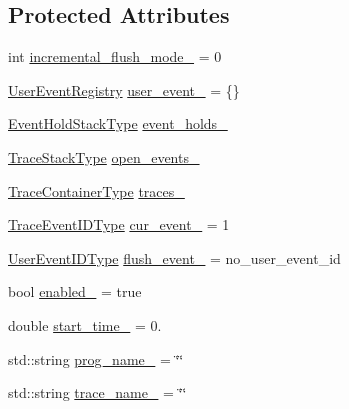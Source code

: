 \subsection*{Protected Attributes}
\begin{DoxyCompactItemize}
\item 
int \hyperlink{structvt_1_1trace_1_1_trace_lite_a0f5139a30b7eef896d0b49b22b97fec3}{incremental\+\_\+flush\+\_\+mode\+\_\+} = 0
\item 
\hyperlink{structvt_1_1trace_1_1_user_event_registry}{User\+Event\+Registry} \hyperlink{structvt_1_1trace_1_1_trace_lite_a7dcadada68a0b250898d7838de01458b}{user\+\_\+event\+\_\+} = \{\}
\item 
\hyperlink{structvt_1_1trace_1_1_trace_lite_af9e05e83b3d0adfb9d45cf13c0bb7525}{Event\+Hold\+Stack\+Type} \hyperlink{structvt_1_1trace_1_1_trace_lite_a323d77bc03ed78b44e632c595433b7ba}{event\+\_\+holds\+\_\+}
\item 
\hyperlink{structvt_1_1trace_1_1_trace_lite_ae827dd1c4f37ac2dbcb6f4898a664b99}{Trace\+Stack\+Type} \hyperlink{structvt_1_1trace_1_1_trace_lite_a11cf264af89fe8dd3703e8897d0bb77b}{open\+\_\+events\+\_\+}
\item 
\hyperlink{structvt_1_1trace_1_1_trace_lite_a346a7751a544de425345a8983ed52146}{Trace\+Container\+Type} \hyperlink{structvt_1_1trace_1_1_trace_lite_a3751cf984ddc83e14f120daf5d533a2c}{traces\+\_\+}
\item 
\hyperlink{namespacevt_1_1trace_a64a7185f3e102df8d8258f263ccd1582}{Trace\+Event\+I\+D\+Type} \hyperlink{structvt_1_1trace_1_1_trace_lite_a06815b5d345c41f07105dd382b4c3c2b}{cur\+\_\+event\+\_\+} = 1
\item 
\hyperlink{namespacevt_1_1trace_a5908920d051c144c89f17c69ed262350}{User\+Event\+I\+D\+Type} \hyperlink{structvt_1_1trace_1_1_trace_lite_acba836a9cc25aee679f7738c8f2721eb}{flush\+\_\+event\+\_\+} = no\+\_\+user\+\_\+event\+\_\+id
\item 
bool \hyperlink{structvt_1_1trace_1_1_trace_lite_a414bdf6f5d6e031264b392aed0e8e320}{enabled\+\_\+} = true
\item 
double \hyperlink{structvt_1_1trace_1_1_trace_lite_a5f5c81900355ce74b084ef64ab69edc4}{start\+\_\+time\+\_\+} = 0.
\item 
std\+::string \hyperlink{structvt_1_1trace_1_1_trace_lite_a8bd3836d6fad28bb428ce3b824a00595}{prog\+\_\+name\+\_\+} = \char`\"{}\char`\"{}
\item 
std\+::string \hyperlink{structvt_1_1trace_1_1_trace_lite_ae6209336c8aabf62ec626fa6b8fbc8ee}{trace\+\_\+name\+\_\+} = \char`\"{}\char`\"{}

\end{DoxyCompactItemize}
